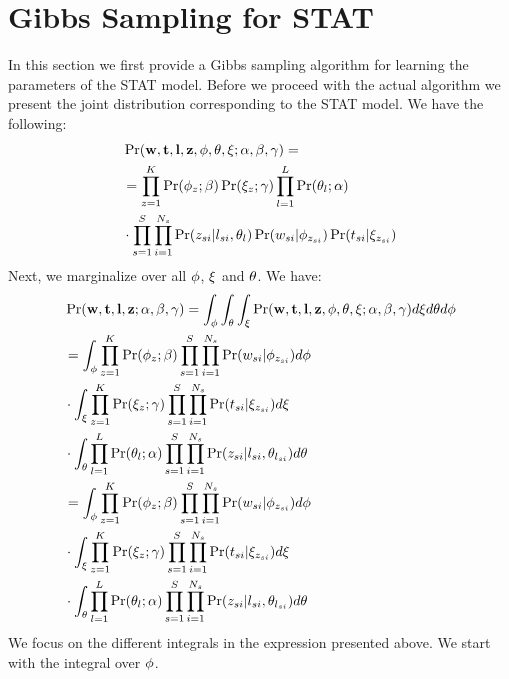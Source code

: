 \documentclass[conference]{IEEEtran}
\newcommand{\model}{{STAT}\xspace} %
\newcommand{\w}{{\bf w}}
\newcommand{\z}{{\bf z}}
\newcommand{\loc}{{\bf l}}
\newcommand{\tim}{{\bf t}}
\begin{document}
\section{Gibbs Sampling for \model}
\label{sec:gibbs}
In this section we first provide a Gibbs sampling algorithm for learning the parameters of the \model model. Before we proceed with the actual algorithm we present the joint distribution corresponding to the \model model. We have the following:
{\scriptsize
\begin{align}
&\Pr(\w,\tim,\loc,\z,{\bf \phi},{\bf \theta},{\bf \xi};\alpha,\beta,\gamma) =  \nonumber \\
&=\prod_{z = 1}^{K}\Pr(\phi_z;\beta)\Pr(\xi_z;\gamma) \prod_{l = 1}^{L}\Pr(\theta_l;\alpha) \nonumber \\
& \cdot \prod_{s = 1}^{S}\prod_{i = 1}^{N_s} \Pr(z_{si}|l_{si},\theta_l)\Pr(w_{si}|\phi_{z_{si}})\Pr(t_{si}|\xi_{z_{si}}) \nonumber
\end{align}}
Next, we marginalize over all ${\bf \phi}$, ${\bf \xi}$ and ${\bf \theta}$. We have:
{\scriptsize
\begin{align}
&\Pr(\w,\tim,\loc,\z;\alpha,\beta,\gamma) =  \int_{\phi}\int_{\theta}\int_{\xi} \Pr(\w,\tim,\loc,\z,{\bf \phi},{\bf \theta},{\bf \xi};\alpha,\beta,\gamma) d\xi d\theta d\phi \nonumber \\
&=\int_{\phi} \prod_{z = 1}^{K}\Pr(\phi_z;\beta) \prod_{s = 1}^{S}\prod_{i = 1}^{N_s}\Pr(w_{si}|\phi_{z_{si}}) d\phi \nonumber \\
& \cdot \int_{\xi} \prod_{z = 1}^{K} \Pr(\xi_z;\gamma)\prod_{s = 1}^{S}\prod_{i = 1}^{N_s}\Pr(t_{si}|\xi_{z_{si}}) d\xi \nonumber \\
&\cdot \int_{\theta} \prod_{l = 1}^{L}\Pr(\theta_l;\alpha)\prod_{s = 1}^{S}\prod_{i = 1}^{N_s}\Pr(z_{si}|l_{si},\theta_{l_{si}})d\theta \nonumber \\
&=\int_{\phi} \prod_{z = 1}^{K}\Pr(\phi_z;\beta) \prod_{s = 1}^{S}\prod_{i = 1}^{N_s}\Pr(w_{si}|\phi_{z_{si}}) d\phi \nonumber \\
&  \cdot \int_{\xi} \prod_{z = 1}^{K} \Pr(\xi_z;\gamma)\prod_{s = 1}^{S}\prod_{i = 1}^{N_s}\Pr(t_{si}|\xi_{z_{si}}) d\xi \nonumber \\
&\cdot \int_{\theta} \prod_{l = 1}^{L}\Pr(\theta_l;\alpha)\prod_{s = 1}^{S}\prod_{i = 1}^{N_s}\Pr(z_{si}|l_{si},\theta_{l_{si}}) d\theta \nonumber
\end{align}
}
We focus on the different integrals in the expression presented above. We start with the integral over ${\bf \phi}$. 
\end{document}
